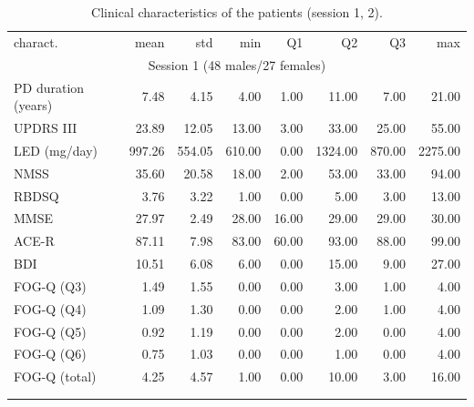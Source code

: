 \begin{table}[htb!]
	\centering
	\begin{threeparttable}
		\caption{Clinical characteristics of the patients (session 1, 2).}
		\label{tab:ch6_clinical_data}
		\footnotesize
		\centering
		\begin{tabular}{l r r r r r r r}
		
			\hline\hline\noalign{\smallskip}
			\rowcolor{gray_table}
			charact. & mean & std & min & Q1 & Q2 & Q3 & max \\
			\multicolumn{8}{c}{Session 1 (48 males/27 females)} \\
			\noalign{\smallskip}\hline\noalign{\smallskip}

			PD duration (years) &    7.48 &    4.15 &    4.00 &    1.00 &   11.00 &    7.00 &   21.00 \\
			UPDRS III           &   23.89 &   12.05 &   13.00 &    3.00 &   33.00 &   25.00 &   55.00 \\
			LED (mg/day)        &  997.26 &  554.05 &  610.00 &    0.00 & 1324.00 &  870.00 & 2275.00 \\
			NMSS                &   35.60 &   20.58 &   18.00 &    2.00 &   53.00 &   33.00 &   94.00 \\
			RBDSQ               &    3.76 &    3.22 &    1.00 &    0.00 &    5.00 &    3.00 &   13.00 \\
			MMSE                &   27.97 &    2.49 &   28.00 &   16.00 &   29.00 &   29.00 &   30.00 \\
			ACE-R               &   87.11 &    7.98 &   83.00 &   60.00 &   93.00 &   88.00 &   99.00 \\
			BDI                 &   10.51 &    6.08 &    6.00 &    0.00 &   15.00 &    9.00 &   27.00 \\
			FOG-Q (Q3)          &    1.49 &    1.55 &    0.00 &    0.00 &    3.00 &    1.00 &    4.00 \\
			FOG-Q (Q4)          &    1.09 &    1.30 &    0.00 &    0.00 &    2.00 &    1.00 &    4.00 \\
			FOG-Q (Q5)          &    0.92 &    1.19 &    0.00 &    0.00 &    2.00 &    0.00 &    4.00 \\
			FOG-Q (Q6)          &    0.75 &    1.03 &    0.00 &    0.00 &    1.00 &    0.00 &    4.00 \\
			FOG-Q (total)       &    4.25 &    4.57 &    1.00 &    0.00 &   10.00 &    3.00 &   16.00 \\

			\noalign{\smallskip}\hline\noalign{\smallskip}
			\multicolumn{8}{c}{Session 2 (27 males/14 females)} \\
			\noalign{\smallskip}\hline\noalign{\smallskip}


\end{tabular}
\end{threeparttable}
\end{table}
